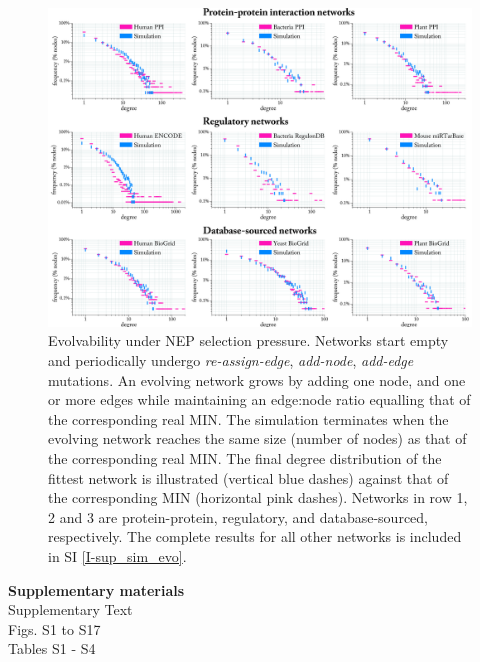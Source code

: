 \documentclass[12pt]{article}
\begin{document}
\begin{figure}[H]
    \centering
    \includegraphics[width=\textwidth]{Figure9.png}
    \caption{
        Evolvability under NEP selection pressure. Networks start empty and periodically undergo \textit{re-assign-edge}, \textit{add-node}, \textit{add-edge} mutations. An evolving network grows by adding one node, and one or more edges while maintaining an edge:node ratio equalling that of the corresponding real MIN. The simulation terminates when the evolving network reaches the same size (number of nodes) as that of the corresponding real MIN. The final degree distribution of the fittest network is illustrated (vertical blue dashes) against that of the corresponding MIN (horizontal pink dashes). Networks in row 1, 2 and 3 are protein-protein, regulatory, and database-sourced, respectively. The complete results for all other networks is included in SI \ref{I-sup_sim_evo}.
    }
    \label{evol_figure}
\end{figure}



\noindent\textbf{\large Supplementary materials}~\\
	\noindent \hspace{35pt} \normalsize Supplementary Text~\\
	\noindent \hspace{35pt} \normalsize Figs. S1 to S17~\\
	\noindent \hspace{35pt} \normalsize Tables S1 - S4~\\
\end{document}
